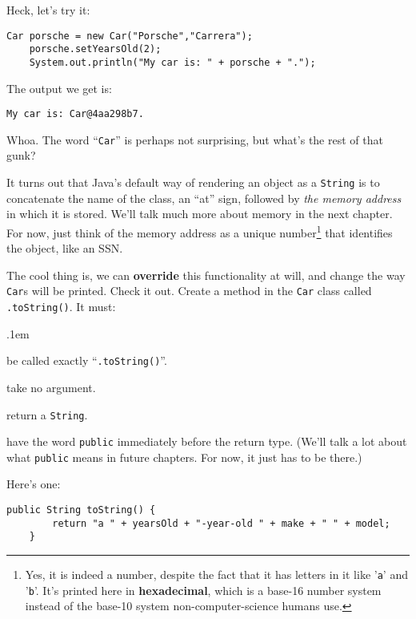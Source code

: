 Heck, let's try it:

\begin{Verbatim}[samepage=true,fontsize=\scriptsize,frame=single]
    Car porsche = new Car("Porsche","Carrera");
    porsche.setYearsOld(2);
    System.out.println("My car is: " + porsche + ".");
\end{Verbatim}

The output we get is:

\begin{verbatim}
My car is: Car@4aa298b7.
\end{verbatim}

Whoa. The word ``\texttt{Car}'' is perhaps not surprising, but what's the rest
of that gunk?

It turns out that Java's default way of rendering an object as a
\texttt{String} is to concatenate the name of the class, an ``at'' sign,
followed by \textit{the memory address} in which it is stored. We'll talk much
more about memory in the next chapter. For now, just think of the memory
address as a unique number\footnote{Yes, it is indeed a number, despite the
fact that it has letters in it like '\texttt{a}' and '\texttt{b}'. It's
printed here in \textbf{hexadecimal}, which is a base-16 number system instead
of the base-10 system non-computer-science humans use.} that identifies the
object, like an SSN.

\begin{samepage}
\label{pg:toString}
The cool thing is, we can \textbf{override} this functionality at will, and
change the way \texttt{Car}s will be printed. Check it out. Create a method in
the \texttt{Car} class called \texttt{.toString()}. It must:

\begin{compactenum}
\itemsep.1em
\item be called exactly ``\texttt{.toString()}''.
\item take no argument.
\item return a \texttt{String}.
\item have the word \texttt{public} immediately before the return type. (We'll
talk a lot about what \texttt{public} means in future chapters. For now, it just has to
be there.)
\end{compactenum}
\end{samepage}

Here's one:

\begin{Verbatim}[samepage=true,fontsize=\scriptsize,frame=single]
    public String toString() {
        return "a " + yearsOld + "-year-old " + make + " " + model;
    }
\end{Verbatim}

